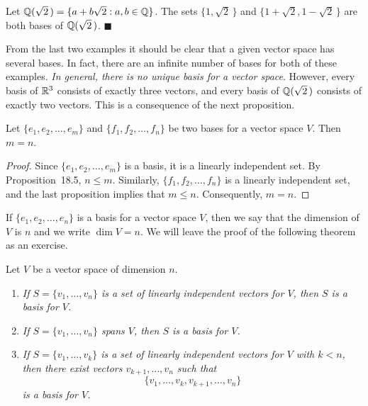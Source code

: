  
\vspace{2 ex}
 
 
Let $\mbox{${\Bbb Q}( \sqrt{2}\, )$} = \{ a + b \sqrt{2} : a, b \in {\Bbb Q} \}$.
The sets $\{1, \sqrt{2}\,  \}$ and $\{1+\sqrt{2}, 1- \sqrt{2}\,  \}$ are
both bases of ${\Bbb Q}( \sqrt{2}\, )$.  
\hspace{\fill} $\blacksquare$


\vspace{2ex}


From the last two examples it should be clear that a given vector
space has several bases. In fact, there are an infinite number of
bases for both of these examples. {\em In general, there is no unique 
basis for a vector space}.  However, every basis of ${\Bbb R}^3$ consists
of exactly three vectors, and every  basis of ${\Bbb Q}(\sqrt{2}\, )$ 
consists of exactly two vectors. This is a consequence of the next 
proposition.


\begin{proposition}
Let $\{ e_1, e_2, \ldots, e_m \}$ and $\{ f_1, f_2, \ldots, f_n \}$ be
two bases for a vector space $V$. Then $m=n$. 
\end{proposition}


\begin{proof}
Since $\{ e_1, e_2, \ldots, e_m \}$ is a basis, it is a linearly
independent set.  By  Proposition~18.5, $n \leq m$. Similarly, $\{
f_1, f_2, \ldots, f_n \}$ is a linearly independent set, and the last
proposition implies that $m \leq n$.  Consequently, $m =n$.
\mbox{\hspace{1in}}
\end{proof}
 

\vspace{2ex}
 

If $\{ e_1, e_2, \ldots, e_n \}$ is a basis for a vector space $V$,
then we say that the {\bfi dimension\/}
of $V$ is $n$ and we write $\dim V =n$\label{vectdim}. 
We will leave the proof of the following theorem as an exercise.


\begin{theorem}
Let $V$ be a vector space of dimension $n$.
\begin{enumerate}

\rm \item \it
If $S = \{v_1, \ldots, v_n \}$ is a set of linearly independent
vectors for $V$, then $S$ is a basis for $V$. 

\rm \item \it
If $S = \{v_1, \ldots, v_n \}$ spans $V$, then $S$ is a basis for $V$. 

\rm \item \it
If $S = \{v_1, \ldots, v_k \}$ is a set of linearly independent
vectors for $V$ with $k < n$, then there exist vectors $v_{k+1},
\ldots, v_n$ such that  
\[
\{v_1, \ldots, v_k, v_{k+1}, \ldots, v_n \}
\] 
is a basis for $V$. 

\end{enumerate}
\end{theorem}


